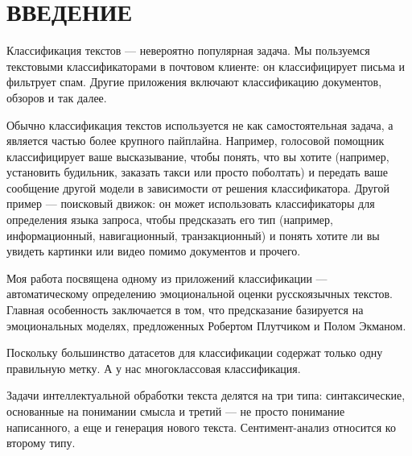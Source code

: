\chapter*{ВВЕДЕНИЕ}

\par
Классификация текстов --- невероятно популярная задача. Мы пользуемся текстовыми классификаторами в почтовом клиенте: он классифицирует письма и фильтрует спам. Другие приложения включают классификацию документов, обзоров и так далее.

\bigskip\par
Обычно классификация текстов используется не как самостоятельная задача, а является частью более крупного пайплайна. Например, голосовой помощник классифицирует ваше высказывание, чтобы понять, что вы хотите (например, установить будильник, заказать такси или просто поболтать) и передать ваше сообщение другой модели в зависимости от решения классификатора.  Другой пример --- поисковый движок: он может использовать классификаторы для определения языка запроса, чтобы предсказать его тип (например, информационный, навигационный, транзакционный) и понять хотите ли вы увидеть картинки или видео помимо документов и прочего.

\bigskip\par
Моя работа посвящена одному из приложений классификации --- автоматическому определению эмоциональной оценки русскоязычных текстов. Главная особенность  заключается в том, что предсказание базируется на эмоциональных моделях, предложенных Робертом Плутчиком и Полом Экманом.


\bigskip\par
Поскольку большинство датасетов для классификации содержат только одну правильную метку. А у нас многоклассовая классификация.

Задачи интеллектуальной обработки текста делятся на три типа: синтаксические, основанные на понимании
смысла и третий --- не просто понимание написанного, а еще и генерация нового текста. Сентимент-анализ
относится ко второму типу.
